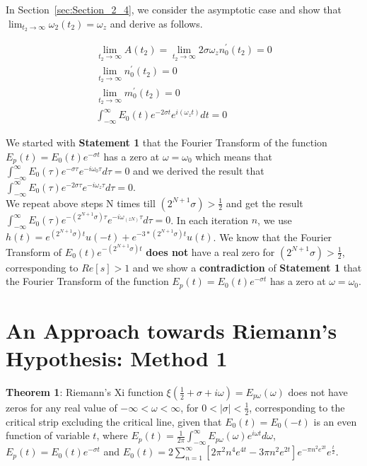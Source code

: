 \documentclass[11pt]{elsarticle}
\begin{document}
In Section~\ref{sec:Section_2_4}, we consider the asymptotic case and show that $\lim_{t_2 \to \infty}  \omega_{2}(t_2) =  \omega_z $ and derive as follows.

\begin{eqnarray*}\label{sec_1_2_eq_5}  
\lim_{t_2 \to \infty} A(t_2) = \lim_{t_2 \to \infty} 2 \sigma  \omega_z n_0^{'}(t_2) =  0 \\
\lim_{t_2 \to \infty} n_0^{'}(t_2) = 0 \\
\lim_{t_2 \to \infty} m_0^{'}(t_2)  = 0 \\
\int_{-\infty}^{\infty}     E_{0}( t)  e^{ -2 \sigma t}  e^{ i( \omega_z t)} dt = 0
\end{eqnarray*}
\begin{equation} \end{equation}


We started with \textbf{Statement 1} that the Fourier Transform of the function $E_p(t) = E_0(t) e^{-\sigma t} $ has a zero at $\omega = \omega_{0}$ which means that $\int_{-\infty}^{\infty}    E_0(\tau) e^{- \sigma \tau} e^{-i \omega_0 \tau} d\tau = 0$ and we derived the result that $\int_{-\infty}^{\infty}    E_0(\tau) e^{-2 \sigma \tau} e^{-i  \omega_z \tau} d\tau = 0$.\\

We repeat above steps N times till $(2^{N+1} \sigma) > \frac{1}{2}$ and get the result $\int_{-\infty}^{\infty}    E_0(\tau) e^{-(2^{N+1} \sigma) \tau} e^{-i \omega_{(zN)} \tau} d\tau = 0$. In each iteration $n$, we use $h(t)=  e^{ (2^{N+1} \sigma) t} u(-t) + e^{ - 3*(2^{N+1} \sigma) t} u(t) $. We know that  the Fourier Transform of $E_{0}(t) e^{-(2^{N+1} \sigma) t}$  \textbf{does not} have a real zero for $(2^{N+1} \sigma) > \frac{1}{2}$, corresponding to $Re[s] > 1$ and we show a \textbf{contradiction} of  \textbf{Statement 1} that the Fourier Transform of the function $E_p(t) = E_0(t) e^{-\sigma t} $ has a zero at $\omega = \omega_{0}$.\\




\clearpage
\section{\label{sec:Section_2} An Approach towards Riemann's Hypothesis: Method 1  \protect\\  \lowercase{} }

\textbf{Theorem 1}:   Riemann's Xi function $\xi(\frac{1}{2} + \sigma + i \omega)= E_{p\omega}(\omega)$ does not have zeros for any real value of $-\infty < \omega < \infty$, for $0 < |\sigma| < \frac{1}{2}$, corresponding to the critical strip excluding the critical line, given that $E_0(t) = E_0(-t)$ is an even function of variable $t$, where $E_p(t) =  \frac{1}{2 \pi} \int_{-\infty}^{\infty} E_{p\omega}(\omega) e^{i \omega t} d\omega $, $E_p(t)= E_0(t) e^{-\sigma t}$ and $E_{0}(t) =   2 \sum_{n=1}^{\infty}  [ 2 \pi^{2} n^{4} e^{4t}    - 3 \pi n^{2}   e^{2t} ]  e^{- \pi n^{2} e^{2t}} e^{\frac{t}{2}} $.\\
\end{document}
